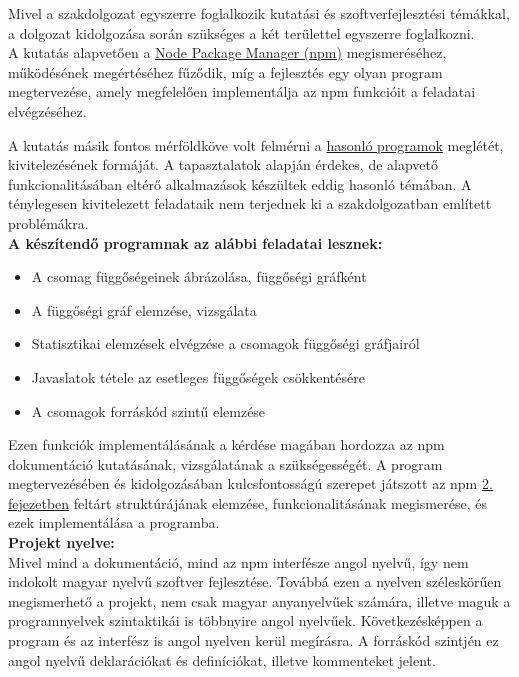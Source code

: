 

Mivel a szakdolgozat egyszerre foglalkozik kutatási és szoftverfejlesztési témákkal, a dolgozat kidolgozása során szükséges a két területtel egyszerre foglalkozni.\\ 

A kutatás alapvetően a \hyperlink{chapter.2}{Node Package Manager (npm)} megismeréséhez, működésének megértéséhez fűződik, míg a fejlesztés egy olyan program megtervezése, amely megfelelően implementálja az npm funkcióit a feladatai elvégzéséhez.

A kutatás másik fontos mérföldköve volt felmérni a \hyperlink{section.3.2}{hasonló programok} meglétét, kivitelezésének formáját. A tapasztalatok alapján érdekes, de alapvető funkcionalitásában eltérő alkalmazások készültek eddig hasonló témában. A ténylegesen kivitelezett feladataik nem terjednek ki a szakdolgozatban említett problémákra.\\

\textbf{A készítendő programnak az alábbi feladatai lesznek:}
\begin{itemize}
	\item A csomag függőségeinek ábrázolása, függőségi gráfként
	\item A függőségi gráf elemzése, vizsgálata
	\item Statisztikai elemzések elvégzése a csomagok függőségi gráfjairól
	\item Javaslatok tétele az esetleges függőségek csökkentésére
	\item A csomagok forráskód szintű elemzése
\end{itemize}

Ezen funkciók implementálásának a kérdése magában hordozza az npm dokumentáció kutatásának, vizsgálatának a szükségességét.
A program megtervezésében és kidolgozásában kulcsfontosságú szerepet játszott az npm \hyperlink{chapter.2}{2. fejezetben} feltárt struktúrájának elemzése, funkcionalitásának megismerése, és ezek implementálása a programba.\\

\textbf{Projekt nyelve:}\\

Mivel mind a dokumentáció, mind az npm interfésze angol nyelvű, így nem indokolt magyar nyelvű szoftver fejlesztése. Továbbá ezen a nyelven széleskörűen megismerhető a projekt, nem csak magyar anyanyelvűek számára, illetve maguk a programnyelvek szintaktikái is többnyire angol nyelvűek. Következésképpen a program és az interfész is angol nyelven kerül megírásra. A forráskód szintjén ez angol nyelvű deklarációkat és definíciókat, illetve kommenteket jelent. 

